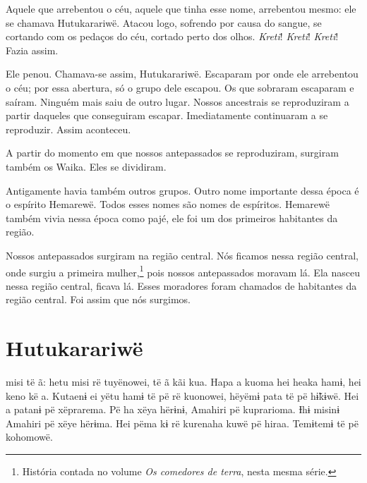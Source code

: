 Aquele que arrebentou o céu, aquele que tinha esse nome, arrebentou
mesmo: ele se chamava Hutukarariwë. Atacou logo, sofrendo por causa do
sangue, se cortando com os pedaços do céu, cortado perto dos
olhos. \textit{Kreti}! \textit{Kreti}! \textit{Kreti}! Fazia assim. 

Ele penou. Chamava-se assim, Hutukarariwë. Escaparam por onde ele
arrebentou o céu; por essa abertura, só o grupo dele escapou. Os que
sobraram escaparam e saíram. Ninguém mais saiu de outro lugar. Nossos
ancestrais se reproduziram a partir daqueles que conseguiram escapar.
Imediatamente continuaram a se reproduzir. Assim aconteceu. 


A partir do momento em que nossos antepassados se reproduziram, surgiram
também os Waika. Eles se dividiram.

Antigamente havia também outros grupos. Outro nome importante dessa
época é o espírito Hemarewë. Todos esses nomes são nomes de espíritos.
Hemarewë também vivia nessa época como pajé, ele foi um dos primeiros
habitantes da região.


Nossos antepassados surgiram na região central. Nós ficamos nessa
região central, onde surgiu a primeira mulher,\footnote{História contada no volume \textit{Os comedores de terra}, nesta mesma série.} pois nossos antepassados
moravam lá. Ela nasceu nessa região central, ficava lá. Esses moradores
foram chamados de habitantes da região central. Foi assim que nós
surgimos.

\chapter{Hutukarariwë}
 
 misi të ã: hetu misi rë tuyënowei, të ã kãi kua. Hapa a kuoma hei
heaka hamɨ, hei keno kë a. Kutaenɨ ei yëtu hamɨ të pë rë kuonowei,
hëyëmɨ pata të pë hɨ̃kɨwë. Hei a patanɨ pë xëprarema. Pë ha xëya hërɨnɨ,
Amahiri pë kuprarioma. Ɨhɨ misinɨ Amahiri pë xëye hërɨma. Hei pëma kɨ rë
kurenaha kuwë pë hiraa. Temɨtemɨ të pë kohomowë.

